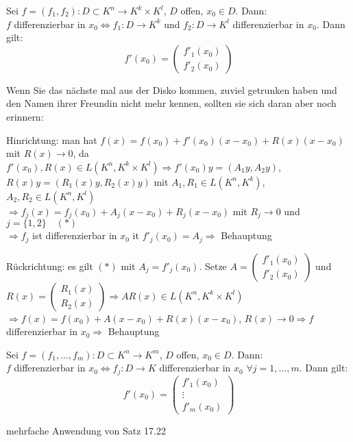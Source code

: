 	\begin{satz}[Reduktion]
		Sei $f=(f_1,f_2):D\subset K^n \to K^k\times K^l$, $D$ offen, $x_0\in D$. Dann: \\
		$f$ differenzierbar in $x_0\iff f_1:D\to K^k$ und $f_2:D\to K^l$ differenzierbar in $x_0$. Dann gilt:
		\begin{equation}
			f'(x_0)=\begin{pmatrix}f'_1(x_0) \\ f'_2(x_0)\end{pmatrix} 
		\end{equation}
	\end{satz}
	\smiley{} Wenn Sie das nächste mal aus der Disko kommen, zuviel getrunken haben und den Namen 
	ihrer Freundin nicht mehr kennen, sollten sie sich daran aber noch erinnern: \smiley{} \\
	\begin{beweis}
		\begin{compactitem}
			\item Hinrichtung: man hat $f(x)=f(x_0)+f'(x_0)(x-x_0)+R(x)(x-x_0)$ mit $R(x)\to 0$, da 
			$f'(x_0),R(x)\in L(K^n,K^k\times K^l) \Rightarrow f'(x_0)y=(A_1y,A_2y)$, $R(x)y=(R_1(x)y,
			R_2(x)y)$ mit $A_1,R_1\in L(K^n,K^k)$, $A_2,R_2\in L(K^n,K^l)$ \\
			$\Rightarrow f_j(x)=f_j(x_0)+A_j(x-x_0)+R_j(x-x_0)$ mit $R_j\to 0$ und $j=\{1,2\}\quad (*)$ \\
			$\Rightarrow  f_j$ ist differenzierbar in $x_0$ it $f'_j(x_0)=A_j\Rightarrow$ Behauptung
			\item Rückrichtung: es gilt $(*)$ mit $A_j=f'_j(x_0)$. Setze $A=\begin{pmatrix}f'_1(x_0) \\ f'_2(x_0)\end{pmatrix}$ und $R(x)=\begin{pmatrix}R_1(x) \\ R_2(x)\end{pmatrix} \Rightarrow
			AR(x)\in L(K^n,K^k\times K^l)$ \\
			$\Rightarrow f(x)=f(x_0)+A(x-x_0)+R(x)(x-x_0)$, $R(x)\to 0\Rightarrow f$ differenzierbar in 
			$x_0\Rightarrow$ Behauptung
		\end{compactitem}
	\end{beweis}

	\begin{folgerung}
		Sei $f=(f_1,...,f_m):D\subset K^n\to K^m$, $D$ offen, $x_0\in D$. Dann: \\
		$f$ differenzierbar in $x_0\iff f_j:D\to K$ differenzierbar in $x_0$ $\forall j=1,...,m$. Dann gilt:
		\begin{equation}
			f'(x_0)=\begin{pmatrix}f'_1(x_0) \\ \vdots \\ f'_m(x_0)\end{pmatrix}
		\end{equation}
	\end{folgerung}
	\begin{beweis}
		mehrfache Anwendung von Satz 17.22
	\end{beweis}

